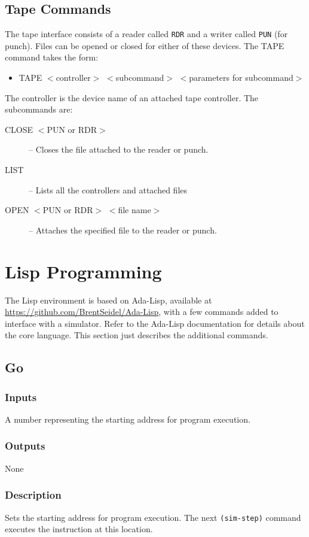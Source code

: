 \documentclass[10pt, openany]{book}
\begin{document}
\subsection{Tape Commands}
The tape interface consists of a reader called \verb|RDR| and a writer called \verb|PUN| (for punch).  Files can be opened or closed for either of these devices.   The TAPE command takes the form:
\begin{itemize}
  \item TAPE $<$controller$>$ $<$subcommand$>$ $<$parameters for subcommand$>$
\end{itemize}
The controller is the device name of an attached tape controller.  The subcommands are:
\begin{description}
  \item[CLOSE $<$PUN or RDR$>$]  -- Closes the file attached to the reader or punch.
  \item[LIST] --  Lists all the controllers and attached files
  \item[OPEN $<$PUN or RDR$>$ $<$file name$>$] --  Attaches the specified file to the reader or punch.
\end{description}


\section{Lisp Programming}
The Lisp environment is based on Ada-Lisp, available at \url{https://github.com/BrentSeidel/Ada-Lisp}, with a few commands added to interface with a simulator.  Refer to the Ada-Lisp documentation for details about the core language.  This section just describes the additional commands.

\subsection{Go}
\subsubsection{Inputs}
A number representing the starting address for program execution.
\subsubsection{Outputs}
None
\subsubsection{Description}
Sets the starting address for program execution.  The next \verb|(sim-step)| command executes the instruction at this location.
\end{document}
